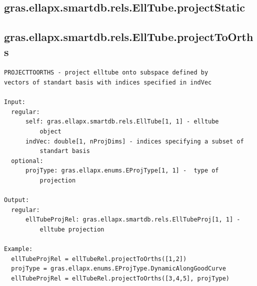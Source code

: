 \documentclass[letterpaper,10pt,english]{sphinxmanual}
\begin{document}
\subsection{gras.ellapx.smartdb.rels.EllTube.projectStatic}
\label{chap_functions:gras-ellapx-smartdb-rels-elltube-projectstatic}

\subsection{gras.ellapx.smartdb.rels.EllTube.projectToOrths}
\label{chap_functions:gras-ellapx-smartdb-rels-elltube-projecttoorths}
\begin{Verbatim}[commandchars=\\\{\}]
PROJECTTOORTHS - project elltube onto subspace defined by
vectors of standart basis with indices specified in indVec

Input:
  regular:
      self: gras.ellapx.smartdb.rels.EllTube[1, 1] - elltube
          object
      indVec: double[1, nProjDims] - indices specifying a subset of
          standart basis
  optional:
      projType: gras.ellapx.enums.EProjType[1, 1] -  type of
          projection

Output:
  regular:
      ellTubeProjRel: gras.ellapx.smartdb.rels.EllTubeProj[1, 1] -
          elltube projection

Example:
  ellTubeProjRel = ellTubeRel.projectToOrths([1,2])
  projType = gras.ellapx.enums.EProjType.DynamicAlongGoodCurve
  ellTubeProjRel = ellTubeRel.projectToOrths([3,4,5], projType)
\end{Verbatim}
\end{document}
